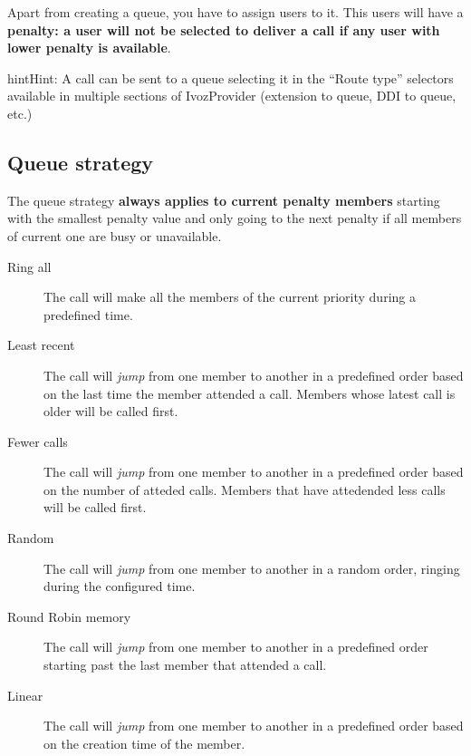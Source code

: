 \documentclass[letterpaper,10pt,english]{sphinxmanual}
\begin{document}
Apart from creating a queue, you have to assign users to it. This users will have
a \textbf{penalty: a user will not be selected to deliver a call if any user with lower
penalty is available}.

\begin{notice}{hint}{Hint:}
A call can be sent to a queue selecting it in the ``Route type'' selectors
available in multiple sections of IvozProvider (extension to queue, DDI
to queue, etc.)
\end{notice}


\subsection{Queue strategy}
\label{company/queues:queue-strategy}
The queue strategy \textbf{always applies to current penalty members} starting with
the smallest penalty value and only going to the next penalty if all members of
current one are busy or unavailable.
\begin{description}
\item[{Ring all}] \leavevmode{}\label{company/queues:term-ring-all}
The call will make all the members of the current priority during a
predefined time.

\item[{Least recent}] \leavevmode{}\label{company/queues:term-least-recent}
The call will \emph{jump} from one member to another in a predefined order
based on the last time the member attended a call. Members whose latest
call is older will be called first.

\item[{Fewer calls}] \leavevmode{}\label{company/queues:term-fewer-calls}
The call will \emph{jump} from one member to another in a predefined order
based on the number of atteded calls. Members that have attedended less
calls will be called first.

\item[{Random}] \leavevmode{}\label{company/queues:term-random}
The call will \emph{jump} from one member to another in a random order,
ringing during the configured time.

\item[{Round Robin memory}] \leavevmode{}\label{company/queues:term-round-robin-memory}
The call will \emph{jump} from one member to another in a predefined order
starting past the last member that attended a call.

\item[{Linear}] \leavevmode{}\label{company/queues:term-linear}
The call will \emph{jump} from one member to another in a predefined order
based on the creation time of the member.

\end{description}
\end{document}
